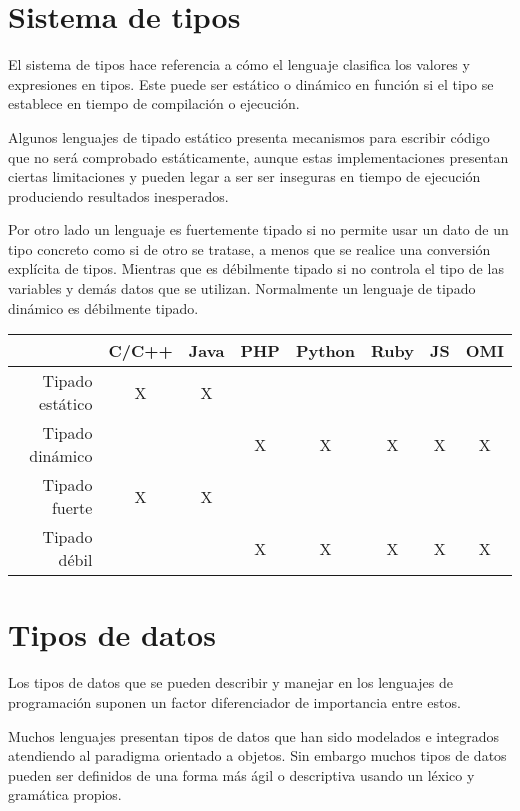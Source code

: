 \section{Sistema de tipos}
El sistema de tipos hace referencia a cómo el lenguaje clasifica los valores
y expresiones en tipos. Este puede ser estático o dinámico en función si el tipo 
se establece en tiempo de compilación o ejecución. 

Algunos lenguajes de tipado estático presenta mecanismos para escribir código 
que no será comprobado estáticamente, aunque estas implementaciones presentan 
ciertas limitaciones y pueden legar a ser ser inseguras en tiempo de ejecución produciendo resultados inesperados.
 
Por otro lado un lenguaje es fuertemente tipado si no permite usar un dato de un tipo concreto
como si de otro se tratase, a menos que se realice una conversión explícita de tipos. Mientras que es 
débilmente tipado si no controla el tipo de las variables y demás datos que se utilizan. Normalmente
un lenguaje de tipado dinámico es débilmente tipado.
 
 \FloatBarrier
\begin{table}[h]
 \begin{center}
\begin{tabular}{|r|c|c|c|c|c|c|c|} \hline
 & C/C++ & Java & PHP  & Python & Ruby & JS & OMI \\ \hline
Tipado estático & X & X &  &  &  &  &  \\ \hline
Tipado dinámico & & & X & X & X & X & X \\ \hline
Tipado fuerte & X & X &  &  &  &  &  \\ \hline
Tipado débil  & & & X & X & X & X & X \\ \hline
\end{tabular}

\end{center}
\end{table}
\FloatBarrier

\section{Tipos de datos}
Los tipos de datos que se pueden describir y manejar en los lenguajes de 
programación suponen un factor diferenciador de importancia entre estos.

Muchos lenguajes presentan tipos de datos que han sido modelados e integrados atendiendo
al paradigma orientado a objetos. Sin embargo muchos tipos de datos pueden ser definidos
de una forma más ágil o descriptiva usando un léxico y gramática propios.   

